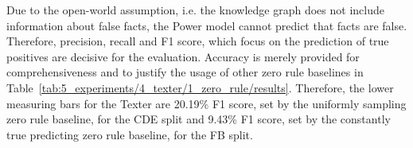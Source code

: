 Due to the open-world assumption, i.e. the knowledge graph does not include information about false facts, the Power model cannot predict that facts are false. Therefore, precision, recall and F1 score, which focus on the prediction of true positives are decisive for the evaluation. Accuracy is merely provided for comprehensiveness and to justify the usage of other zero rule baselines in Table~\ref{tab:5_experiments/4_texter/1_zero_rule/results}. Therefore, the lower measuring bars for the Texter are 20.19\% F1 score, set by the uniformly sampling zero rule baseline, for the CDE split and 9.43\% F1 score, set by the constantly true predicting zero rule baseline, for the FB split.
